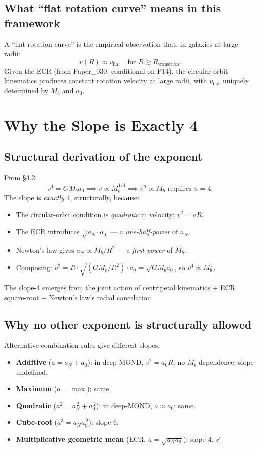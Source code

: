 \documentclass[11pt,a4paper]{article}
\begin{document}
\subsection{What ``flat rotation curve'' means in this framework}

A ``flat rotation curve'' is the empirical observation that, in galaxies at large radii:
\[
v(R) \approx v_\mathrm{flat} \quad \text{for } R \gtrsim R_\mathrm{transition}.
\]
Given the ECR (from Paper\_030, conditional on P14), the circular-orbit kinematics produces constant rotation velocity at large radii, with $v_\mathrm{flat}$ uniquely determined by $M_b$ and $a_0$.

\section{Why the Slope is Exactly 4}

\subsection{Structural derivation of the exponent}

From \S4.2:
\[
v^4 = G M_b a_0 \implies v \propto M_b^{1/4} \implies v^n \propto M_b \text{ requires } n = 4.
\]
The slope is \emph{exactly} 4, structurally, because:

\begin{itemize}[noitemsep]
\item The circular-orbit condition is \emph{quadratic} in velocity: $v^2 = aR$.
\item The ECR introduces $\sqrt{a_N \cdot a_0}$ --- a \emph{one-half-power} of $a_N$.
\item Newton's law gives $a_N \propto M_b/R^2$ --- a \emph{first-power} of $M_b$.
\item Composing: $v^2 = R \cdot \sqrt{(GM_b/R^2) \cdot a_0} = \sqrt{GM_b a_0}$, so $v^4 \propto M_b^{\,1}$.
\end{itemize}

The slope-4 emerges from the joint action of centripetal kinematics + ECR square-root + Newton's law's radial cancelation.

\subsection{Why no other exponent is structurally allowed}

Alternative combination rules give different slopes:

\begin{itemize}[noitemsep]
\item \textbf{Additive} ($a = a_N + a_0$): in deep-MOND, $v^2 = a_0 R$; no $M_b$ dependence; slope undefined.
\item \textbf{Maximum} ($a = \max$): same.
\item \textbf{Quadratic} ($a^2 = a_N^{\,2} + a_0^{\,2}$): in deep-MOND, $a \approx a_0$; same.
\item \textbf{Cube-root} ($a^3 = a_N a_0^{\,2}$): slope-6.
\item \textbf{Multiplicative geometric mean} (ECR, $a = \sqrt{a_N a_0}$): slope-4. $\checkmark$
\end{itemize}
\end{document}
